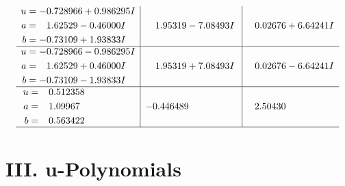 \documentclass[1p]{elsarticle_modified}
\theoremstyle{definition}
\begin{document}
$$\begin{array}{c|c|c}
\begin{aligned}
u &= -0.728966 + 0.986295 I \\
a &= \phantom{-}1.62529 - 0.46000 I \\
b &= -0.73109 + 1.93833 I\end{aligned}
 & \phantom{-}1.95319 - 7.08493 I & \phantom{-}0.02676 + 6.64241 I \\ \hline\begin{aligned}
u &= -0.728966 - 0.986295 I \\
a &= \phantom{-}1.62529 + 0.46000 I \\
b &= -0.73109 - 1.93833 I\end{aligned}
 & \phantom{-}1.95319 + 7.08493 I & \phantom{-}0.02676 - 6.64241 I \\ \hline\begin{aligned}
u &= \phantom{-}0.512358\phantom{ +0.000000I} \\
a &= \phantom{-}1.09967\phantom{ +0.000000I} \\
b &= \phantom{-}0.563422\phantom{ +0.000000I}\end{aligned}
 & -0.446489\phantom{ +0.000000I} & \phantom{-}2.50430\phantom{ +0.000000I}\\
 \hline 
 \end{array}$$\newpage
\newpage\renewcommand{\arraystretch}{1}
\centering \section*{ III. u-Polynomials}
\end{document}
